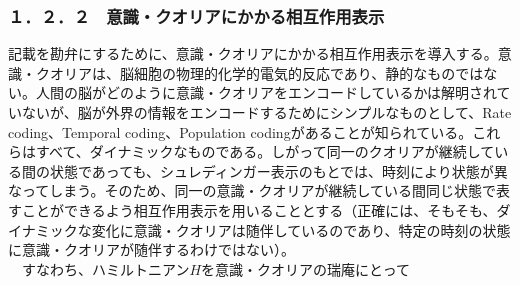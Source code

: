 \subsubsection{１．２．２　意識・クオリアにかかる相互作用表示}
記載を勘弁にするために、意識・クオリアにかかる相互作用表示を導入する。意識・クオリアは、脳細胞の物理的化学的電気的反応であり、静的なものではない。人間の脳がどのように意識・クオリアをエンコードしているかは解明されていないが、脳が外界の情報をエンコードするためにシンプルなものとして、Rate coding、Temporal coding、Population codingがあることが知られている\cite{wikipediac}。これらはすべて、ダイナミックなものである。しがって同一のクオリアが継続している間の状態であっても、シュレディンガー表示のもとでは、時刻により状態が異なってしまう。そのため、同一の意識・クオリアが継続している間同じ状態で表すことができるよう相互作用表示を用いることとする（正確には、そもそも、ダイナミックな変化に意識・クオリアは随伴しているのであり、特定の時刻の状態に意識・クオリアが随伴するわけではない）。\\
　すなわち、ハミルトニアン$H$を意識・クオリアの瑞庵にとって


